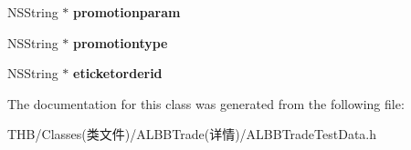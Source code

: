 \begin{DoxyCompactItemize}
\mbox{\label{interface_a_l_b_b_trade_test_data_a723ae0df463330677ae0500bae74e25c}} 
N\+S\+String $\ast$ {\bfseries promotionparam}
\item 
\mbox{\label{interface_a_l_b_b_trade_test_data_a4e2e84fa66d5ed6554a08e044c74bff4}} 
N\+S\+String $\ast$ {\bfseries promotiontype}
\item 
\mbox{\label{interface_a_l_b_b_trade_test_data_a63ce05e348eb2bd7f4315dd9a1de695e}} 
N\+S\+String $\ast$ {\bfseries eticketorderid}
\end{DoxyCompactItemize}


The documentation for this class was generated from the following file\+:\begin{DoxyCompactItemize}
\item 
T\+H\+B/\+Classes(类文件)/\+A\+L\+B\+B\+Trade(详情)/A\+L\+B\+B\+Trade\+Test\+Data.\+h\end{DoxyCompactItemize}
